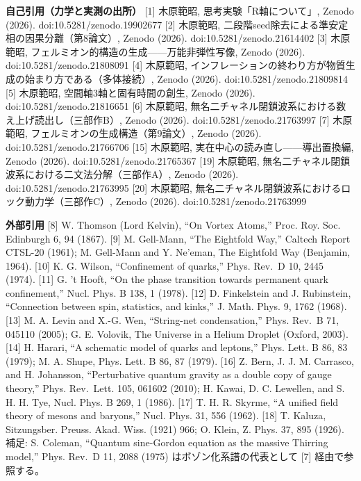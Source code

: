 \documentclass[
]{ltjsarticle}
\begin{document}
\textbf{自己引用（力学と実測の出所）} {[}1{]} 木原範昭,
思考実験「R軸について」, Zenodo (2026). doi:10.5281/zenodo.19902677
{[}2{]} 木原範昭, 二段階seed除去による準安定相の因果分離（第8論文）,
Zenodo (2026). doi:10.5281/zenodo.21614402 {[}3{]} 木原範昭,
フェルミオン的構造の生成------万能非弾性写像, Zenodo (2026).
doi:10.5281/zenodo.21808091 {[}4{]} 木原範昭,
インフレーションの終わり方が物質生成の始まり方である（多体接続）, Zenodo
(2026). doi:10.5281/zenodo.21809814 {[}5{]} 木原範昭,
空間軸3軸と固有時間の創生, Zenodo (2026). doi:10.5281/zenodo.21816651
{[}6{]} 木原範昭,
無名二チャネル閉鎖波系における数え上げ読出し（三部作B）, Zenodo (2026).
doi:10.5281/zenodo.21763997 {[}7{]} 木原範昭,
フェルミオンの生成構造（第9論文）, Zenodo (2026).
doi:10.5281/zenodo.21766706 {[}15{]} 木原範昭,
実在中心の読み直し------導出置換編, Zenodo (2026).
doi:10.5281/zenodo.21765367 {[}19{]} 木原範昭,
無名二チャネル閉鎖波系における二文法分解（三部作A）, Zenodo (2026).
doi:10.5281/zenodo.21763995 {[}20{]} 木原範昭,
無名二チャネル閉鎖波系におけるロック動力学（三部作C）, Zenodo (2026).
doi:10.5281/zenodo.21763999

\textbf{外部引用} {[}8{]} W. Thomson (Lord Kelvin), ``On Vortex Atoms,''
Proc. Roy. Soc. Edinburgh 6, 94 (1867). {[}9{]} M. Gell-Mann, ``The
Eightfold Way,'' Caltech Report CTSL-20 (1961); M. Gell-Mann and Y.
Ne'eman, The Eightfold Way (Benjamin, 1964). {[}10{]} K. G. Wilson,
``Confinement of quarks,'' Phys. Rev.~D 10, 2445 (1974). {[}11{]} G. 't
Hooft, ``On the phase transition towards permanent quark confinement,''
Nucl. Phys. B 138, 1 (1978). {[}12{]} D. Finkelstein and J. Rubinstein,
``Connection between spin, statistics, and kinks,'' J. Math. Phys. 9,
1762 (1968). {[}13{]} M. A. Levin and X.-G. Wen, ``String-net
condensation,'' Phys. Rev.~B 71, 045110 (2005); G. E. Volovik, The
Universe in a Helium Droplet (Oxford, 2003). {[}14{]} H. Harari, ``A
schematic model of quarks and leptons,'' Phys. Lett. B 86, 83 (1979); M.
A. Shupe, Phys. Lett. B 86, 87 (1979). {[}16{]} Z. Bern, J. J. M.
Carrasco, and H. Johansson, ``Perturbative quantum gravity as a double
copy of gauge theory,'' Phys. Rev.~Lett. 105, 061602 (2010); H. Kawai,
D. C. Lewellen, and S. H. H. Tye, Nucl. Phys. B 269, 1 (1986). {[}17{]}
T. H. R. Skyrme, ``A unified field theory of mesons and baryons,'' Nucl.
Phys. 31, 556 (1962). {[}18{]} T. Kaluza, Sitzungsber. Preuss. Akad.
Wiss. (1921) 966; O. Klein, Z. Phys. 37, 895 (1926). 補足: S. Coleman,
``Quantum sine-Gordon equation as the massive Thirring model,'' Phys.
Rev.~D 11, 2088 (1975) はボゾン化系譜の代表として {[}7{]}
経由で参照する。
\end{document}
